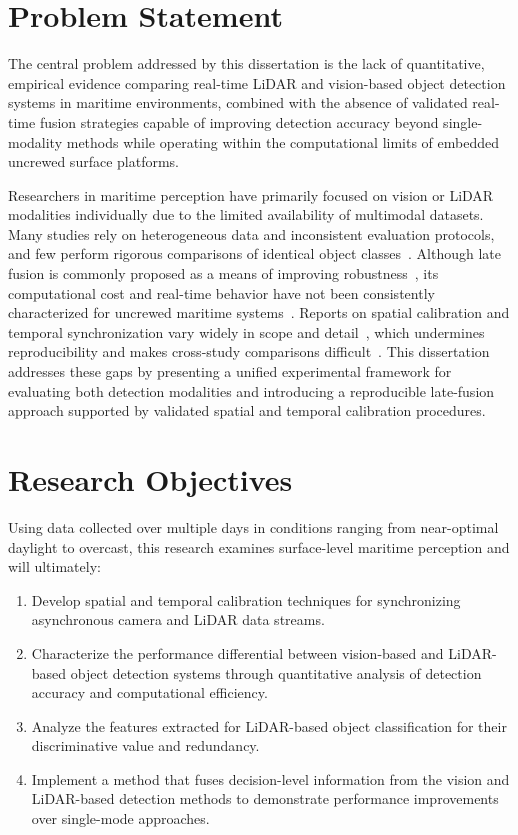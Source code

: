 \documentclass{erauthesis}
\begin{document}
\section{Problem Statement}

The central problem addressed by this dissertation is the lack of quantitative, empirical evidence comparing real-time \ac{LiDAR} and vision-based object detection systems in maritime environments, combined with the absence of validated real-time fusion strategies capable of improving detection accuracy beyond single-modality methods while operating within the computational limits of embedded uncrewed surface platforms.

Researchers in maritime perception have primarily focused on vision or \ac{LiDAR} modalities individually due to the limited availability of multimodal datasets. Many studies rely on heterogeneous data and inconsistent evaluation protocols, and few perform rigorous comparisons of identical object classes~\cite{zhang2021}. Although late fusion is commonly proposed as a means of improving robustness~\cite{farahnakian2020}, its computational cost and real-time behavior have not been consistently characterized for uncrewed maritime systems~\cite{haghbayan2018}. Reports on spatial calibration and temporal synchronization vary widely in scope and detail~\cite{westenberger2011}, which undermines reproducibility and makes cross-study comparisons difficult~\cite{su2023}. This dissertation addresses these gaps by presenting a unified experimental framework for evaluating both detection modalities and introducing a reproducible late-fusion approach supported by validated spatial and temporal calibration procedures.

\section{Research Objectives}

Using data collected over multiple days in conditions ranging from near-optimal daylight to overcast, this research examines surface-level maritime perception and will ultimately:
\begin{enumerate}
    \item Develop spatial and temporal calibration techniques for synchronizing asynchronous camera and \ac{LiDAR} data streams.
    \item Characterize the performance differential between vision-based and LiDAR-based object detection systems through quantitative analysis of detection accuracy and computational efficiency.
    \item Analyze the features extracted for LiDAR-based object classification for their discriminative value and redundancy.
    \item Implement a method that fuses decision-level information from the vision and LiDAR-based detection methods to demonstrate performance improvements over single-mode approaches.
\end{enumerate}
\end{document}

